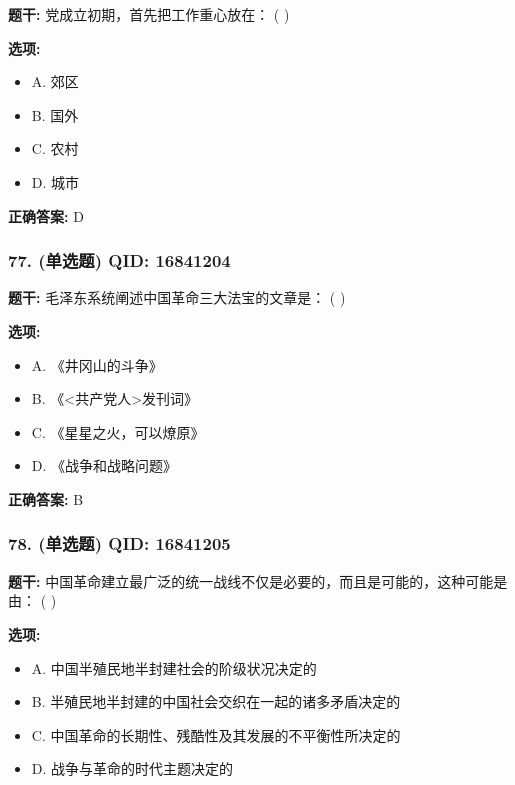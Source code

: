 \documentclass[12pt,UTF8]{ctexart}
\begin{document}
\textbf{题干:}
党成立初期，首先把工作重心放在： ( )

\textbf{选项:}
\begin{itemize}[leftmargin=*]

  \item A. 郊区

  \item B. 国外

  \item C. 农村

  \item D. 城市

\end{itemize}

\textbf{正确答案:}
D

\vspace{0.3em}\hrulefill\vspace{0.7em}

\subsubsection*{77. (单选题) \small QID: 16841204}

\textbf{题干:}
毛泽东系统阐述中国革命三大法宝的文章是： ( )

\textbf{选项:}
\begin{itemize}[leftmargin=*]

  \item A. 《井冈山的斗争》

  \item B. 《<共产党人>发刊词》

  \item C. 《星星之火，可以燎原》

  \item D. 《战争和战略问题》

\end{itemize}

\textbf{正确答案:}
B

\vspace{0.3em}\hrulefill\vspace{0.7em}

\subsubsection*{78. (单选题) \small QID: 16841205}

\textbf{题干:}
中国革命建立最广泛的统一战线不仅是必要的，而且是可能的，这种可能是由： ( )

\textbf{选项:}
\begin{itemize}[leftmargin=*]

  \item A. 中国半殖民地半封建社会的阶级状况决定的

  \item B. 半殖民地半封建的中国社会交织在一起的诸多矛盾决定的

  \item C. 中国革命的长期性、残酷性及其发展的不平衡性所决定的

  \item D. 战争与革命的时代主题决定的

\end{itemize}
\end{document}
